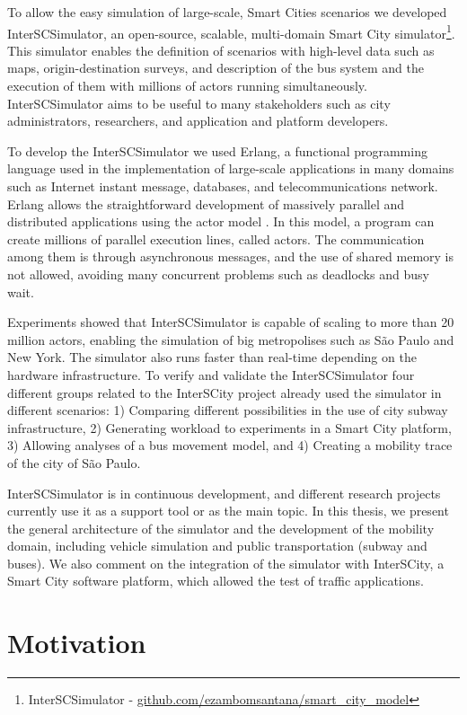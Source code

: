To allow the easy simulation of large-scale, Smart Cities scenarios we developed InterSCSimulator, an open-source, scalable, multi-domain Smart City simulator\footnote{InterSCSimulator - \url{github.com/ezambomsantana/smart_city_model}}. This simulator enables the definition of scenarios with high-level data such as maps, origin-destination surveys, and description of the bus system and the execution of them with millions of actors running simultaneously. InterSCSimulator aims to be useful to many stakeholders such as city administrators, researchers, and application and platform developers.

To develop the InterSCSimulator we used Erlang, a functional programming language used in the implementation of large-scale applications in many domains such as Internet instant message, databases, and telecommunications network. Erlang allows the straightforward development of massively parallel and distributed applications using the actor model \cite{agha1985actors}. In this model, a program can create millions of parallel execution lines, called actors. The communication among them is through asynchronous messages, and the use of shared memory is not allowed, avoiding many concurrent problems such as deadlocks and busy wait.

Experiments showed that InterSCSimulator is capable of scaling to more than 20 million actors, enabling the simulation of big metropolises such as S\~ao Paulo and New York. The simulator also runs faster than real-time depending on the hardware infrastructure. To verify and validate the InterSCSimulator four different groups related to the InterSCity project already used the simulator in different scenarios: 1) Comparing different possibilities in the use of city subway infrastructure, 2) Generating workload to experiments in a Smart City platform, 3) Allowing analyses of a bus movement model, and 4) Creating a mobility trace of the city of S\~ao Paulo.

InterSCSimulator is in continuous development, and different research projects currently use it as a support tool or as the main topic. In this thesis, we present the general architecture of the simulator and the development of the mobility domain, including vehicle simulation and public transportation (subway and buses). We also comment on the integration of the simulator with InterSCity, a Smart City software platform, which allowed the test of traffic applications.

\section{Motivation}
\label{sec:contribucoes}


